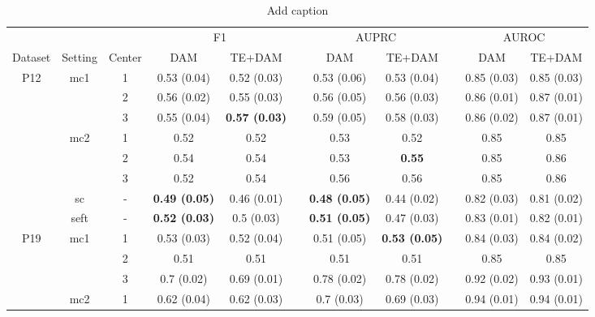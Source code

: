 \documentclass[journal,twoside,web]{ieeecolor}
\begin{document}
\begin{table}[htbp]
    \centering
    \caption{Add caption}
      \begin{tabular}{ccccccccccc}
      \toprule
      \toprule
            &       &       & \multicolumn{2}{c}{F1} &       & \multicolumn{2}{c}{AUPRC} &       & \multicolumn{2}{c}{AUROC} \\
  \cmidrule{4-5}\cmidrule{7-8}\cmidrule{10-11}    Dataset & Setting & Center & DAM   & TE+DAM &       & DAM   & TE+DAM &       & DAM   & TE+DAM \\
      \midrule
      \multirow{8}[6]{*}{P12} & \multirow{3}[2]{*}{mc1} & 1     & 0.53 (0.04) & 0.52 (0.03) &       & 0.53 (0.06) & 0.53 (0.04) &       & 0.85 (0.03) & 0.85 (0.03) \\
            &       & 2     & 0.56 (0.02) & 0.55 (0.03) &       & 0.56 (0.05) & 0.56 (0.03) &       & 0.86 (0.01) & 0.87 (0.01) \\
            &       & 3     & 0.55 (0.04) & \textbf{0.57 (0.03)} &       & 0.59 (0.05) & 0.58 (0.03) &       & 0.86 (0.02) & 0.87 (0.01) \\
  \cmidrule{2-11}          & \multirow{3}[2]{*}{mc2} & 1     & 0.52  & 0.52  &       & 0.53  & 0.52  &       & 0.85  & 0.85 \\
            &       & 2     & 0.54  & 0.54  &       & 0.53  & \textbf{0.55} &       & 0.85  & 0.86 \\
            &       & 3     & 0.52  & 0.54  &       & 0.56  & 0.56  &       & 0.85  & 0.86 \\
  \cmidrule{2-11}          & sc    & -     & \textbf{0.49 (0.05)} & 0.46 (0.01) &       & \textbf{0.48 (0.05)} & 0.44 (0.02) &       & 0.82 (0.03) & 0.81 (0.02) \\
            & seft  & -     & \textbf{0.52 (0.03)} & 0.5 (0.03) &       & \textbf{0.51 (0.05)} & 0.47 (0.03) &       & 0.83 (0.01) & 0.82 (0.01) \\
      \midrule
      \multirow{8}[6]{*}{P19} & \multirow{3}[2]{*}{mc1} & 1     & 0.53 (0.03) & 0.52 (0.04) &       & 0.51 (0.05) & \textbf{0.53 (0.05)} &       & 0.84 (0.03) & 0.84 (0.02) \\
            &       & 2     & 0.51  & 0.51  &       & 0.51  & 0.51  &       & 0.85  & 0.85 \\
            &       & 3     & 0.7 (0.02) & 0.69 (0.01) &       & 0.78 (0.02) & 0.78 (0.02) &       & 0.92 (0.02) & 0.93 (0.01) \\
  \cmidrule{2-11}          & \multirow{3}[2]{*}{mc2} & 1     & 0.62 (0.04) & 0.62 (0.03) &       & 0.7 (0.03) & 0.69 (0.03) &       & 0.94 (0.01) & 0.94 (0.01) \\

\end{tabular}
\end{table}
\end{document}
